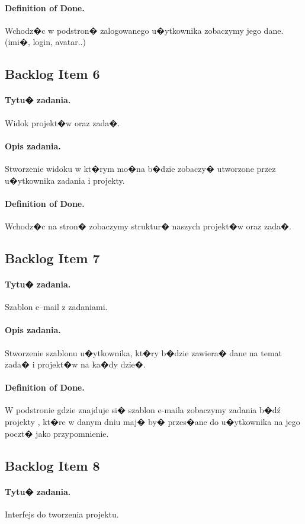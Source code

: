 ﻿\documentclass[a4paper]{article}
\begin{document}
\paragraph{Definition of Done.} Wchodz�c w podstron� zalogowanego u�ytkownika zobaczymy jego dane. (imi�, login, avatar..)

\subsection{Backlog Item 6} 
\paragraph{Tytu� zadania.} Widok projekt�w oraz zada�.
\paragraph{Opis zadania.} Stworzenie widoku w kt�rym mo�na b�dzie zobaczy� utworzone przez u�ytkownika zadania i projekty.
\paragraph{Definition of Done.} Wchodz�c na stron� zobaczymy struktur� naszych projekt�w oraz zada�.

\subsection{Backlog Item 7} 
\paragraph{Tytu� zadania.} Szablon e--mail z zadaniami.
\paragraph{Opis zadania.} Stworzenie szablonu u�ytkownika, kt�ry b�dzie zawiera� dane na temat zada� i projekt�w na ka�dy dzie�.
\paragraph{Definition of Done.} W podstronie gdzie znajduje si� szablon e-maila zobaczymy zadania b�dź projekty , kt�re w danym dniu maj� by� przes�ane do u�ytkownika na jego poczt� jako przypomnienie.

\subsection{Backlog Item 8} 
\paragraph{Tytu� zadania.} Interfejs do tworzenia projektu.
\end{document}

